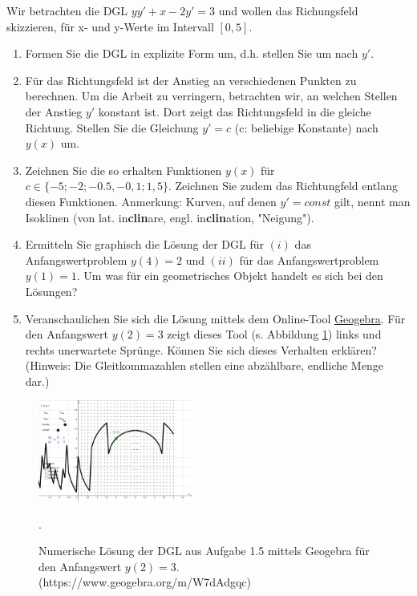 \item Wir betrachten die DGL $yy'+x-2y'=3$ und wollen das Richungsfeld skizzieren, für x- und y-Werte im Intervall $[0,5]$.
\begin{enumerate}
\item Formen Sie die DGL in explizite Form um, d.h. stellen Sie um nach $y'$.
\item Für das Richtungsfeld ist der Anstieg an verschiedenen Punkten zu berechnen. Um die Arbeit zu verringern, betrachten wir, an welchen Stellen der Anstieg $y'$ konstant ist. Dort zeigt das Richtungsfeld in die gleiche Richtung. Stellen Sie die Gleichung $y'=c$ (c: beliebige Konstante) nach $y(x)$ um.
\item Zeichnen Sie die so erhalten Funktionen $y(x)$ für $c\in\lbrace-5;-2;-0.5,-0,1;1,5\rbrace$. Zeichnen Sie zudem das Richtungfeld entlang diesen Funktionen. Anmerkung: Kurven, auf denen $y'=const$ gilt, nennt man Isoklinen (von lat. in\textbf{clin}are, engl. in\textbf{clin}ation, "Neigung").
\item Ermitteln Sie graphisch die Lösung der DGL für $(i)$ das Anfangswertproblem $y(4)=2$ und $(ii)$ für das Anfangswertproblem $y(1) = 1$. Um was für ein geometrisches Objekt handelt es sich bei den Lösungen?
\item Veranschaulichen Sie sich die Lösung mittels dem Online-Tool \href{https://www.geogebra.org/m/W7dAdgqc}{Geogebra}. Für den Anfangswert $y(2)=3$ zeigt dieses Tool (s. Abbildung \ref{ex-ode-slope-field-1-img-a}) links und rechts unerwartete Sprünge. Können Sie sich dieses Verhalten erklären? (Hinweis: Die Gleitkommazahlen stellen eine abzählbare, endliche Menge dar.)
\end{enumerate}


\begin{figure}[ht]
	\centering
	\includegraphics[width=0.45\textwidth]{../tex-snippets/ex-ode-slope-field-1-img-a.png}
	\caption{Numerische Lösung der DGL aus Aufgabe 1.5 mittels Geogebra für den Anfangswert $y(2)=3$. (https://www.geogebra.org/m/W7dAdgqc)}.
	\label{ex-ode-slope-field-1-img-a}
\end{figure}

